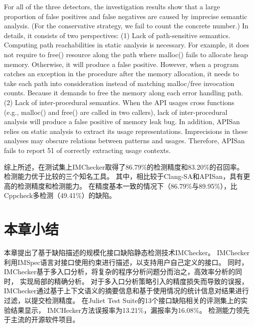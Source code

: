 For all of the three detectors, the investigation results show
that a large proportion of false positives and false negatives are
caused by imprecise semantic analysis. (For the conservative
strategy, we fail to count the concrete number.) In details,
it consists of two perspectives: (1) Lack of path-sensitive
semantics. Computing path reachabilities in static analysis
is necessary. For example, it does not require to free()
resource along the path where malloc() fails to allocate
heap memory. Otherwise, it will produce a false positive. However,
when a program catches an exception in the procedure
after the memory allocation, it needs to take each path into
consideration instead of matching malloc/free invocation
counts. Because it demands to free the memory along each
error handling path. (2) Lack of inter-procedural semantics.
When the API usages cross functions (e.g., malloc() and
free() are called in two callers), lack of inter-procedural
analysis will produce a false positive of memory leak bug. In
addition, APISan relies on static analysis to extract its usage
representations. Imprecisions in these analyses may obscure
relations between patterns and usages. Therefore, APISan fails
to report 51%
of correctly extracting usage contexts.

综上所述，在测试集上IMChecker取得了86.79\%的检测精度和83.20\%的召回率。
检测能力优于比较的三个知名工具。
其中，相比较于Clang-SA和APISan，具有更高的检测精度和检测能力。
在精度基本一致的情况下（86.79\%与89.95\%），比Cppcheck多检测（49.41\%）的缺陷。


\section{本章小结}
\label{sec:3.5}
本章提出了基于缺陷描述的规模化接口缺陷静态检测技术IMChecker。
IMChecker利用IMSpec语言对接口使用约束进行描述，以支持用户自己定义的接口。
同时，IMChecker基于多入口分析，将复杂的程序分析问题分而治之，高效率分析的同时，
实现局部的精确分析。
对于多入口分析策略引入的精度损失而导致的误报，
IMChecker通过基于上下文语义的摘要信息和基于使用情况的统计信息对结果进行过滤，以提交检测精度。
在Juliet Test Suite的13个接口缺陷相关的评测集上的实验结果显示，
IMCHecker方法误报率为13.21\%，漏报率为16.08\%。
检测能力领先于主流的开源软件项目。
